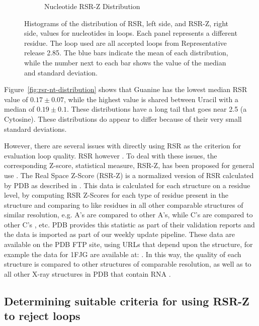 \begin{figure}[ht]
\begin{subfigure}[b]{0.49\textwidth}
    \caption{Nucleotide RSR-Z Distribution}
    \label{fig:rsrz-nt-distribution}
  \end{subfigure}
  \caption{Histograms of the distribution of RSR, left side, and RSR-Z, right
  side, values for nucleotides in loops. Each panel represents a different
  residue. The loop used are all accepted loops from Representative release
  2.85. The blue bars indicate the mean of each distribution, while the number
  next to each bar shows the value of the median and standard deviation.}
  \label{fig:nt-quality-distribution}
\end{figure}

Figure~\ref{fig:rsr-nt-distribution} shows that Guanine has the lowest median
RSR value of $0.17 \pm 0.07$, while the highest value is shared between Uracil
with a median of $0.19 \pm 0.1$. These distributions have a long tail that goes
near 2.5 (a Cytosine). These distributions do appear to differ because of their
very small standard deviations.

However, there are several issues with directly using RSR as the criterion for
evaluation loop quality. RSR however \cite{Tickle2012}. To deal with these
issues, the corresponding Z-score, statistical measure, RSR-Z, has been proposed
for general use \cite{Gore2012}. The Real Space Z-Score (RSR-Z) is a normalized
version of RSR calculated by PDB as described in \cite{Gore2012}. This data is
calculated for each structure on a residue level, by computing RSR Z-Scores for
each type of residue present in the structure and comparing to like residues in
all other comparable structures of similar resolution, e.g. A's are compared to
other A's, while C's are compared to other C's \cite{Gore2012, Kleywegt2004a},
etc. PDB provides this statistic as part of their validation reports and the
data is imported as part of our weekly update pipeline. These data are available
on the PDB FTP site, using URLs that depend upon the structure, for example the
data for 1FJG are available at:
. In this way,
the quality of each structure is compared to other structures of comparable
resolution, as well as to all other X-ray structures in PDB that contain RNA
\cite{Gore2012}.

\subsection{Determining suitable criteria for using RSR-Z to reject loops}

